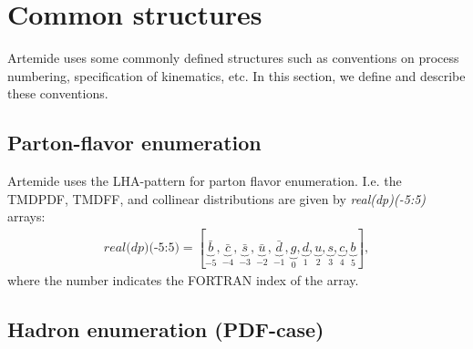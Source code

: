 \documentclass[prd,nofootinbib,eqsecnum,final]{revtex4}
\renewcommand{\(}{\left(}
\renewcommand{\)}{\right)}
\renewcommand{\[}{\left[}
\renewcommand{\]}{\right]}
\begin{document}
\newpage
\section{Common structures}
Artemide uses some commonly defined structures such as conventions on process numbering, specification of kinematics, etc. In this section, we define and describe these conventions.

\subsection{Parton-flavor enumeration}

Artemide uses the LHA-pattern for parton flavor enumeration. I.e. the TMDPDF, TMDFF, and collinear distributions are given by \textit{real(dp)(-5:5)} arrays: \begin{eqnarray}
\textit{real(dp)(-5:5)}=[
\underbrace{\bar b}_{-5},\underbrace{\bar c}_{-4},\underbrace{\bar s}_{-3},\underbrace{\bar u}_{-2},\underbrace{\bar d}_{-1},
\underbrace{g}_{0},
\underbrace{d}_{1},\underbrace{u}_{2},\underbrace{s}_{3},\underbrace{c}_{4},\underbrace{b}_{5}
],
\end{eqnarray}
where the number indicates the FORTRAN index of the array.

\subsection{Hadron enumeration (PDF-case)}
\end{document}
